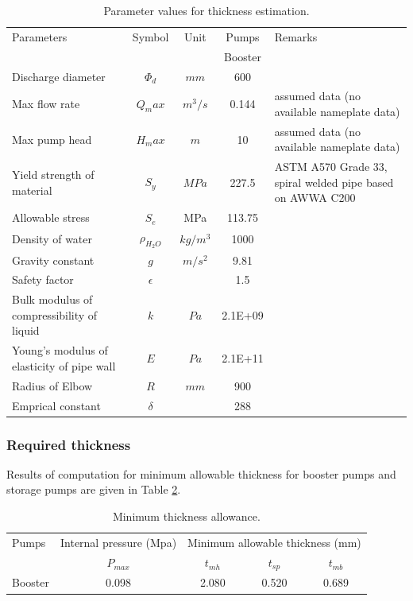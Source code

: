\begin{table}[h]
	\caption{Parameter values for thickness estimation.}
	\label{ch05_tbl_thicknesscalc}
	{\footnotesize
\begin{tabular}{p{4cm}|c|c|c|p{4cm}}
	\hline

\hline
Parameters & Symbol & Unit & Pumps & Remarks \\ 
\cline{4-4}
 &  &  & Booster &  \\ 
\hline
Discharge diameter & $\Phi_d$ & $mm$ & 600 &  \\ 
Max flow rate & $Q_max$ & $m^3/s$ & 0.144 & assumed data (no available nameplate data) \\ 
Max pump head & $H_max$ & $m$ & 10 & assumed data (no available nameplate data) \\ 
Yield strength of material & $S_y$ & $MPa$ & 227.5 & ASTM A570 Grade 33, spiral welded pipe based on AWWA C200 \\ 
Allowable stress & $S_e$ & MPa & 113.75 &  \\ 
Density of water & $\rho_{H_2O}$ & $kg/m^3$ & 1000 &  \\ 
Gravity constant & $g$ & $m/s^2$ & 9.81 &  \\ 
Safety factor & $\epsilon$ &  & 1.5 &  \\ 
Bulk modulus of compressibility of liquid & $k$ & $Pa$ & 2.1E+09 &  \\ 
Young's modulus of elasticity of pipe wall & $E$ & $Pa$ & 2.1E+11 &  \\ 
Radius of Elbow & $R$ & $mm$ & 900 &  \\ 
Emprical constant & $\delta$ &  & 288 &  \\ 
\hline
\end{tabular}


	}
\end{table}

\subsubsection{Required thickness}
Results of computation for minimum allowable thickness for booster pumps and storage pumps are given in Table \ref{ch05_tbl_thicknesscalcresult}.

\begin{table}[h]
	\caption{Minimum thickness allowance.}
	\label{ch05_tbl_thicknesscalcresult}
	{\footnotesize
	
\begin{tabular}{l|l|l|l|l}
\hline
Pumps & \multicolumn{1}{c|}{Internal pressure  (Mpa)} & \multicolumn{3}{c}{Minimum allowable thickness (mm)} \\ 
\cline{3-5}
 & \multicolumn{1}{c|}{$P_{max}$} & \multicolumn{1}{c|}{$t_{mh}$} & \multicolumn{1}{c|}{$t_{sp}$} & \multicolumn{1}{c}{$t_{mb}$} \\ 
\hline
Booster & \multicolumn{1}{c|}{0.098} & \multicolumn{1}{c|}{2.080} & \multicolumn{1}{c|}{0.520} & \multicolumn{1}{c}{0.689} \\ 
\hline
\end{tabular}

		
	}
\end{table}

